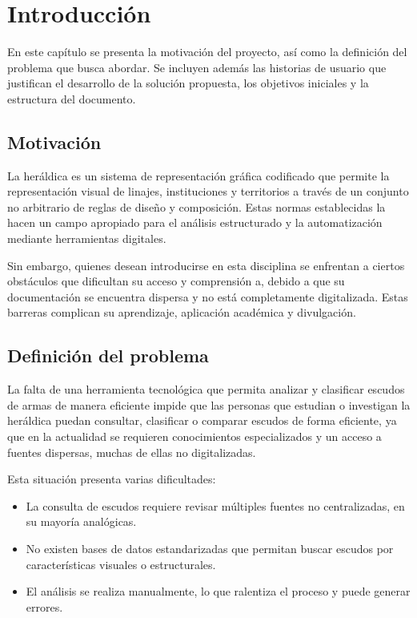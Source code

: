 \chapter{Introducción}

En este capítulo se presenta la motivación del proyecto, así como la definición
del problema que busca abordar. Se incluyen además las historias de usuario que
justifican el desarrollo de la solución propuesta, los objetivos iniciales y la
estructura del documento.

\section{Motivación}
La heráldica es un sistema de representación gráfica codificado que permite
la representación visual de linajes, instituciones y territorios a través de
un conjunto no arbitrario de reglas de diseño y composición. Estas normas
establecidas la hacen un campo apropiado para el análisis estructurado y la
automatización mediante herramientas digitales.

Sin embargo, quienes desean introducirse en esta disciplina se enfrentan a
ciertos obstáculos que dificultan su acceso y comprensión a, debido a que su
documentación se encuentra dispersa y no está completamente digitalizada. Estas 
barreras complican su aprendizaje, aplicación académica y divulgación.

\section{Definición del problema}

La falta de una herramienta tecnológica que permita analizar y clasificar escudos de 
armas de manera eficiente impide que las personas que estudian o investigan la heráldica
puedan consultar, clasificar o comparar escudos de forma eficiente, ya que en la actualidad
se requieren conocimientos especializados y un acceso a fuentes dispersas, muchas de ellas
no digitalizadas.

Esta situación presenta varias dificultades:

\begin{itemize}
    \item La consulta de escudos requiere revisar múltiples fuentes no centralizadas, 
    en su mayoría analógicas.
    \item No existen bases de datos estandarizadas que permitan buscar escudos por
    características visuales o estructurales.
    \item El análisis se realiza manualmente, lo que ralentiza el proceso y puede
    generar errores.
\end{itemize}

